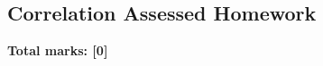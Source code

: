 \documentclass[../s1]{subfiles}
\begin{document}
\subsection*{Correlation Assessed Homework}
\thispagestyle{fancy}



\begin{flushright}
\textbf{Total marks: [0]}
\end{flushright}
\end{document}
